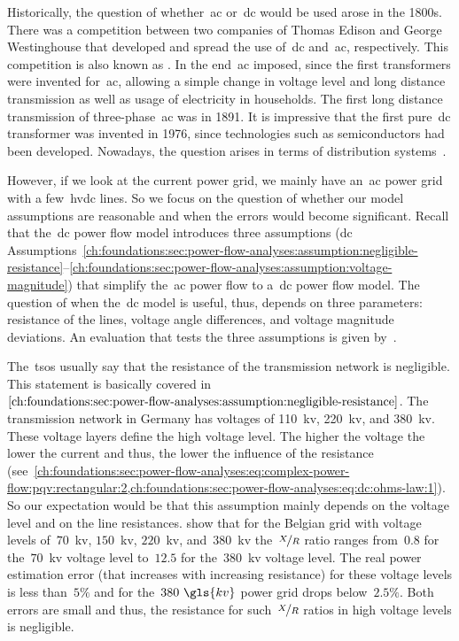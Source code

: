 % 
Historically, the question of whether~\gls{ac} or~\gls{dc} would be used arose
in the 1800s. There was a competition between two companies of Thomas Edison and
George Westinghouse that developed and spread the use of~\gls{dc} and~\gls{ac},
respectively. This competition is also known as .
In the end~\gls{ac} imposed, since the first transformers were invented
for~\gls{ac}, allowing a simple change in voltage level and long distance
transmission as well as usage of electricity in households. The first long
distance transmission of three-phase~\gls{ac} was in 1891. It is impressive that
the first pure~\gls{dc} transformer was invented in 1976, since technologies
such as semiconductors had been developed. Nowadays, the question arises in
terms of distribution systems~\parencite{Ham07}.

However, if we look at the current power grid, we mainly have an~\gls{ac} power
grid with a few~\gls{hvdc} lines. So we focus on the question of whether our
model assumptions are reasonable and when the errors would become significant.
Recall that the~\gls{dc} power flow model introduces three assumptions (\gls{dc}
Assumptions~\ref{ch:foundations:sec:power-flow-analyses:assumption:negligible-resistance}--\ref{ch:foundations:sec:power-flow-analyses:assumption:voltage-magnitude})
that simplify the~\gls{ac} power flow to a~\gls{dc} power flow model. The
question of when the~\gls{dc} model is useful, thus, depends on three
parameters: resistance of the lines, voltage angle differences, and voltage
magnitude deviations. An evaluation that tests the three assumptions is given
by~\textcite{Pur05}.

The~\gls{tso}{s} usually say that the resistance of the transmission network is
negligible. This statement is basically covered
in~$\cref{ch:foundations:sec:power-flow-analyses:assumption:negligible-resistance}$.
The transmission network in Germany has voltages of 110~\gls{kv}, 220~\gls{kv},
and 380~\gls{kv}. These voltage layers define the high voltage level. The higher
the voltage the lower the current and thus, the lower the influence of the
resistance
(see~\cref{ch:foundations:sec:power-flow-analyses:eq:complex-power-flow:pqv:rectangular:2,ch:foundations:sec:power-flow-analyses:eq:dc:ohms-law:1}).
So our expectation would be that this assumption mainly depends on the voltage
level and on the line resistances. \textcite[p.4]{Pur05} show that for the
Belgian grid with voltage levels of~$70$~\gls{kv}, $150$~\gls{kv},
$220$~\gls{kv}, and~$380$~\gls{kv} the~$\nicefrac{X}{R}$
ratio ranges from~$0.8$ for the~$70$~\gls{kv} voltage level to~$12.5$ for
the~$380$~\gls{kv} voltage level. The real power estimation error (that
increases with increasing resistance) for these voltage levels is less
than~$5\%$ and for the~$380~\gls{kv}$ power grid drops below~$2.5\%$. Both
errors are small and thus, the resistance for
such~$\nicefrac{X}{R}$ ratios in high voltage levels is
negligible.%

